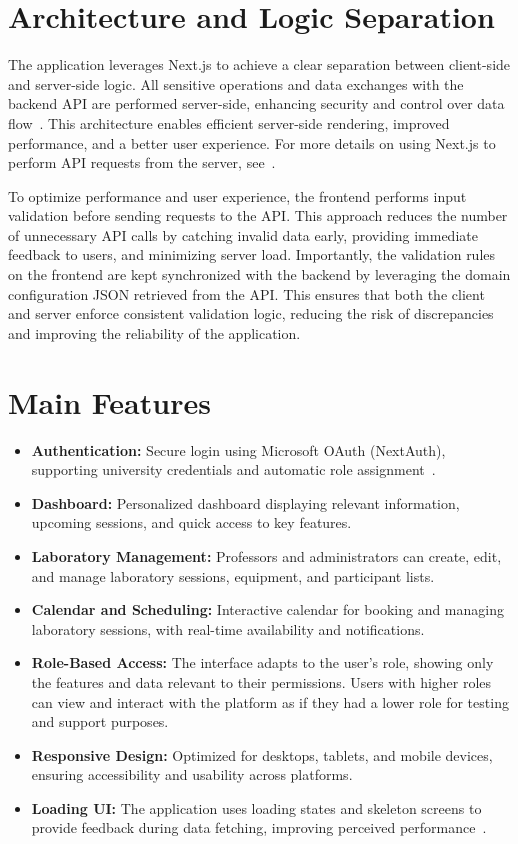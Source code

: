 \section{Architecture and Logic Separation}

The application leverages Next.js to achieve a clear separation between client-side and server-side logic. All sensitive operations and data exchanges with the backend API are performed server-side, enhancing security and control over data flow~\cite{nextjs-server-client-components,nextjs-data-fetching}. This architecture enables efficient server-side rendering, improved performance, and a better user experience. For more details on using Next.js to perform API requests from the server, see~\cite{auth0-nextjs-server-actions}.

To optimize performance and user experience, the frontend performs input validation before sending requests to the API. This approach reduces the number of unnecessary API calls by catching invalid data early, providing immediate feedback to users, and minimizing server load. Importantly, the validation rules on the frontend are kept synchronized with the backend by leveraging the domain configuration JSON retrieved from the API. This ensures that both the client and server enforce consistent validation logic, reducing the risk of discrepancies and improving the reliability of the application.

\section{Main Features}
\begin{itemize}
    \item \textbf{Authentication:} Secure login using Microsoft OAuth (NextAuth), supporting university credentials and automatic role assignment~\cite{nextjs-authentication}.
    \item \textbf{Dashboard:} Personalized dashboard displaying relevant information, upcoming sessions, and quick access to key features.
    \item \textbf{Laboratory Management:} Professors and administrators can create, edit, and manage laboratory sessions, equipment, and participant lists.
    \item \textbf{Calendar and Scheduling:} Interactive calendar for booking and managing laboratory sessions, with real-time availability and notifications.
    \item \textbf{Role-Based Access:} The interface adapts to the user's role, showing only the features and data relevant to their permissions. Users with higher roles can view and interact with the platform as if they had a lower role for testing and support purposes.
    \item \textbf{Responsive Design:} Optimized for desktops, tablets, and mobile devices, ensuring accessibility and usability across platforms.
    \item \textbf{Loading UI:} The application uses loading states and skeleton screens to provide feedback during data fetching, improving perceived performance~\cite{nextjs-loading-ui}.
\end{itemize}

